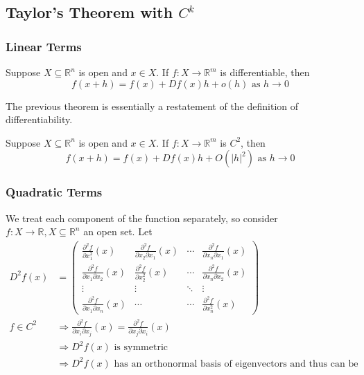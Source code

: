 \documentclass[11pt]{elegantbook}
\begin{document}
\subsection{Taylor's Theorem with $C^k$}
\subsubsection*{Linear Terms}
\begin{theorem}
    Suppose $X \subseteq \mathbb{R}^n$ is open and $x \in X$. If $f: X \rightarrow \mathbb{R}^m$ is differentiable, then
    $$
    f(x+h)=f(x)+D f(x) h+o(h) \text { as } h \rightarrow 0
    $$
\end{theorem}
The previous theorem is essentially a restatement of the definition of differentiability.

\begin{theorem}
    Suppose $X \subseteq \mathbb{R}^n$ is open and $x \in X$. If $f: X \rightarrow \mathbb{R}^m$ is $C^2$, then
    $$
    f(x+h)=f(x)+D f(x) h+O\left(|h|^2\right) \text { as } h \rightarrow 0
    $$
\end{theorem}

\subsubsection*{Quadratic Terms}
We treat each component of the function separately, so consider $f: X \rightarrow \mathbb{R}, X \subseteq \mathbb{R}^n$ an open set. Let
$$
\begin{aligned}
D^2 f(x) & =\left(\begin{array}{cccc}
\frac{\partial^2 f}{\partial x_1^2}(x) & \frac{\partial^2 f}{\partial x_2 \partial x_1}(x) & \cdots & \frac{\partial^2 f}{\partial x_n \partial x_1}(x) \\
\frac{\partial^2 f}{\partial x_1 \partial x_2}(x) & \frac{\partial^2 f}{\partial x_2^2}(x) & \cdots & \frac{\partial^2 f}{\partial x_n \partial x_2}(x) \\
\vdots & \vdots & \ddots & \vdots \\
\frac{\partial^2 f}{\partial x_1 \partial x_n}(x) & \cdots & \cdots & \frac{\partial^2 f}{\partial x_n^2}(x)
\end{array}\right) \\
f \in C^2 & \Rightarrow \frac{\partial^2 f}{\partial x_i \partial x_j}(x)=\frac{\partial^2 f}{\partial x_j \partial x_i}(x) \\
& \Rightarrow D^2 f(x) \text { is symmetric } \\
& \Rightarrow D^2 f(x) \text { has an orthonormal basis of eigenvectors and thus can be diagonalized}
\end{aligned}
$$
\end{document}
